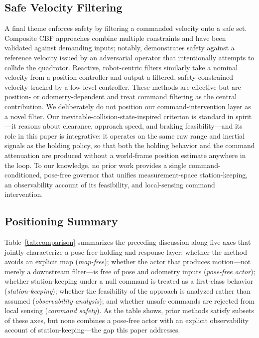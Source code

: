 \documentclass[11pt]{article}
\begin{document}
\subsection{Safe Velocity Filtering}
A final theme enforces safety by filtering a commanded velocity onto a safe
set. Composite CBF approaches combine multiple constraints and have been
validated against demanding inputs; notably, \cite{compositecbf2025}
demonstrates safety against a reference velocity issued by an adversarial
operator that intentionally attempts to collide the quadrotor. Reactive,
robot-centric filters similarly take a nominal velocity from a position
controller and output a filtered, safety-constrained velocity tracked by a
low-level controller\cite{reactive2026}. These methods are effective but are
position- or odometry-dependent and treat command filtering as the central
contribution. We deliberately do not position our command-intervention layer
as a novel filter. Our inevitable-collision-state-inspired criterion is
standard in spirit---it reasons about clearance, approach speed, and braking
feasibility---and its role in this paper is integrative: it operates on the
same raw range and inertial signals as the holding policy, so that both the
holding behavior and the command attenuation are produced without a
world-frame position estimate anywhere in the loop. To our knowledge, no prior
work provides a single command-conditioned, pose-free governor that unifies
measurement-space station-keeping, an observability account of its feasibility,
and local-sensing command intervention.

\subsection{Positioning Summary}
Table~\ref{tab:comparison} summarizes the preceding discussion along five axes
that jointly characterize a pose-free holding-and-response layer: whether the
method avoids an explicit map (\emph{map-free}); whether the actor that
produces motion---not merely a downstream filter---is free of pose and
odometry inputs (\emph{pose-free actor}); whether station-keeping under a null
command is treated as a first-class behavior (\emph{station-keeping}); whether
the feasibility of the approach is analyzed rather than assumed
(\emph{observability analysis}); and whether unsafe commands are rejected from
local sensing (\emph{command safety}). As the table shows, prior methods
satisfy subsets of these axes, but none combines a pose-free actor with an
explicit observability account of station-keeping---the gap this paper
addresses.
\end{document}
